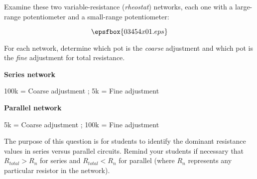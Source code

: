 

Examine these two variable-resistance ({\it rheostat}) networks, each one with a large-range potentiometer and a small-range potentiometer:

$$\epsfbox{03454x01.eps}$$

For each network, determine which pot is the {\it coarse} adjustment and which pot is the {\it fine} adjustment for total resistance.







\noindent
{\bf Series network}

100k = Coarse adjustment ; 5k = Fine adjustment

\vskip 10pt

\noindent
{\bf Parallel network}

5k = Coarse adjustment ; 100k = Fine adjustment







The purpose of this question is for students to identify the dominant resistance values in series versus parallel circuits.  Remind your students if necessary that $R_{total} > R_n$ for series and $R_{total} < R_n$ for parallel (where $R_n$ represents any particular resistor in the network).





